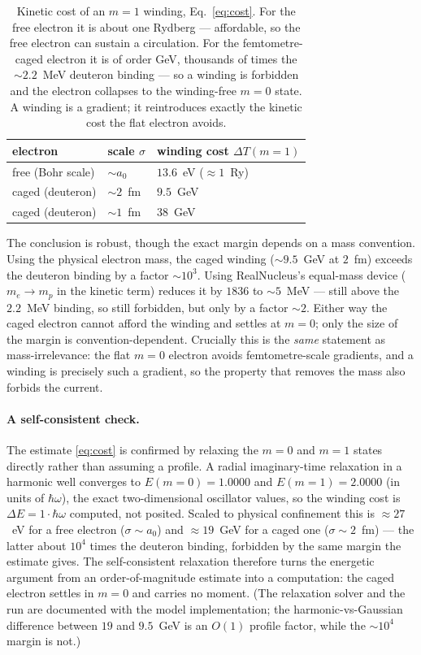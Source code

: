 \documentclass[11pt]{article}
\begin{document}
\begin{table}[h]
\centering
\small
\renewcommand{\arraystretch}{1.15}
\begin{tabular}{lll}
\toprule
electron & scale $\sigma$ & winding cost $\Delta T(m{=}1)$ \\
\midrule
free (Bohr scale)          & ${\sim}a_0$ & $13.6$~eV \quad($\approx 1$~Ry) \\
caged (deuteron)           & ${\sim}2$~fm & $9.5$~GeV \\
caged (deuteron)           & ${\sim}1$~fm & $38$~GeV \\
\bottomrule
\end{tabular}
\caption{Kinetic cost of an $m{=}1$ winding, Eq.~\eqref{eq:cost}. For the free electron it is about one
Rydberg --- affordable, so the free electron can sustain a circulation. For the femtometre-caged electron
it is of order GeV, thousands of times the ${\sim}2.2$~MeV deuteron binding --- so a winding is forbidden
and the electron collapses to the winding-free $m{=}0$ state. A winding is a gradient; it reintroduces
exactly the kinetic cost the flat electron avoids.}
\label{tab:cost}
\end{table}

The conclusion is robust, though the exact margin depends on a mass convention. Using the physical
electron mass, the caged winding ($\sim\!9.5$~GeV at $2$~fm) exceeds the deuteron binding by a factor
$\sim\!10^{3}$. Using RealNucleus's equal-mass device ($m_e\!\to\!m_p$ in the kinetic term) reduces it by
$1836$ to $\sim\!5$~MeV --- still above the $2.2$~MeV binding, so still forbidden, but only by a factor
$\sim\!2$. Either way the caged electron cannot afford the winding and settles at $m=0$; only the size of
the margin is convention-dependent. Crucially this is the \emph{same} statement as mass-irrelevance: the
flat $m=0$ electron avoids femtometre-scale gradients, and a winding is precisely such a gradient, so the
property that removes the mass also forbids the current.

\paragraph{A self-consistent check.} The estimate \eqref{eq:cost} is confirmed by relaxing the $m=0$ and
$m=1$ states directly rather than assuming a profile. A radial imaginary-time relaxation in a harmonic
well converges to $E(m{=}0)=1.0000$ and $E(m{=}1)=2.0000$ (in units of $\hbar\omega$), the exact
two-dimensional oscillator values, so the winding cost is $\Delta E = 1\cdot\hbar\omega$ computed, not
posited. Scaled to physical confinement this is $\approx 27$~eV for a free electron ($\sigma\sim a_0$) and
$\approx 19$~GeV for a caged one ($\sigma\sim 2$~fm) --- the latter about $10^4$ times the deuteron
binding, forbidden by the same margin the estimate gives. The self-consistent relaxation therefore turns
the energetic argument from an order-of-magnitude estimate into a computation: the caged electron settles
in $m=0$ and carries no moment. (The relaxation solver and the run are documented with the model
implementation; the harmonic-vs-Gaussian difference between $19$ and $9.5$~GeV is an $O(1)$ profile factor,
while the $\sim\!10^4$ margin is not.)
\end{document}
